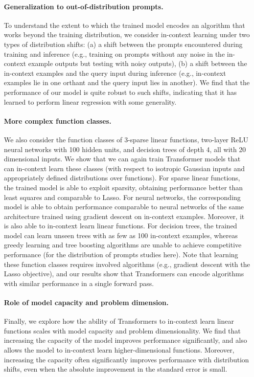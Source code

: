 \documentclass{article}
\begin{document}
\paragraph{Generalization to out-of-distribution prompts.}
To understand the extent to which the trained model encodes an algorithm that works beyond the training distribution, we consider in-context learning under two types of distribution shifts: (a) a shift between the prompts encountered during training and inference (e.g., training on prompts without any noise in the in-context example outputs but testing with noisy outputs), (b) a shift between the in-context examples and the query input during inference (e.g., in-context examples lie in one orthant and the query input lies in another). 
We find that the  performance of our model is quite robust to such shifts, indicating that it has learned to perform linear regression with some generality.

\paragraph{More complex function classes.}
We also consider the function classes of 3-sparse linear functions, two-layer ReLU neural networks with 100 hidden units, and decision trees of depth 4, all with 20 dimensional inputs.
We show that we can again train Transformer models that can in-context learn these classes (with respect to isotropic Gaussian inputs and appropriately defined distributions over functions). 
For sparse linear functions, the trained model is able to exploit sparsity, obtaining performance better than least squares and comparable to Lasso.
For neural networks, the corresponding model is able to obtain performance comparable to neural networks of the same architecture trained using gradient descent on in-context examples. Moreover, it is also able to in-context learn linear functions.
For decision trees, the trained model can learn unseen trees with as few as 100 in-context examples, whereas greedy learning and tree boosting algorithms are unable to achieve competitive performance (for the distribution of prompts studies here).
Note that learning these function classes requires involved algorithms (e.g., gradient descent with the Lasso objective), and our results show that Transformers can encode algorithms with similar performance in a single forward pass.

\paragraph{Role of model capacity and problem dimension.}
Finally, we explore how the ability of Transformers to in-context learn linear functions scales with model capacity and problem dimensionality. We find that increasing the capacity of the model improves performance significantly, and also allows the model to in-context learn higher-dimensional functions.
Moreover, increasing the capacity often significantly improves performance with distribution shifts, even when the absolute improvement in the standard error is small.
\end{document}
